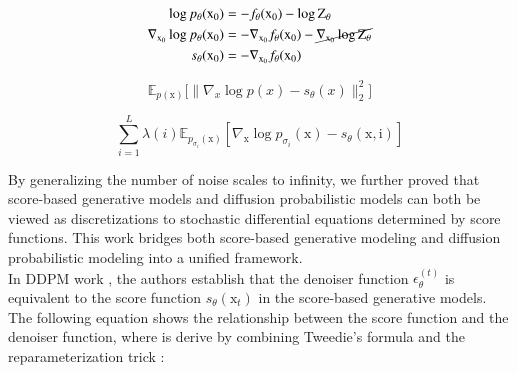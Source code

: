 \begin{equation}\label{eqn:score-function}
    \begin{split}
        \log p_{\theta}(\mathrm{x}_{0}) &= -f_{\theta}(\mathrm{x}_{0}) - \log \mathrm{Z}_{\theta}  \\
        \nabla_{\mathrm{x}_{0}}\log p_{\theta}(\mathrm{x}_{0}) &= -\nabla_{\mathrm{x}_{0}} f_{\theta}(\mathrm{x}_{0}) - \cancel{\nabla_{\mathrm{x}_{0}}\log \mathrm{Z}_{\theta}} \\
        s_{\theta}(\mathrm{x}_{0}) &= -\nabla_{\mathrm{x}_{0}} f_{\theta}(\mathrm{x}_{0})
    \end{split}
\end{equation}


\begin{equation}
   \mathbb{E}_{p(\mathrm{x})}\bigg[\| \nabla_{x}\log p(x) - s_{\theta}(x)\|_{2}^{2} \bigg]
\end{equation}

\begin{equation}\label{train-objective-ncsn}
    \sum_{i=1}^{L} \lambda (i) \mathbb{E}_{p_{\sigma_{i}}(\mathrm{x})} [ \nabla_{\mathrm{x}} \log p_{\sigma_{i}}(\mathrm{x}) - s_{\theta}(\mathrm{x, i}) ]
\end{equation}


\noindent By generalizing the number of noise scales to infinity, we further proved that score-based generative models and diffusion probabilistic models can both be viewed as discretizations to stochastic differential equations determined by score functions. This work bridges both score-based generative modeling and diffusion probabilistic modeling into a unified framework. \\

\noindent In DDPM work \cite{ho2020denoising}, the authors establish that the denoiser function $\epsilon_{\theta}^{(t)}$ is equivalent to the score function $s_{\theta}(\mathrm{x}_{t})$ in the score-based generative models. The following equation shows the relationship between the score function and the denoiser function, where is derive by combining Tweedie's formula and the reparameterization trick \cite{luo2022understanding}:

